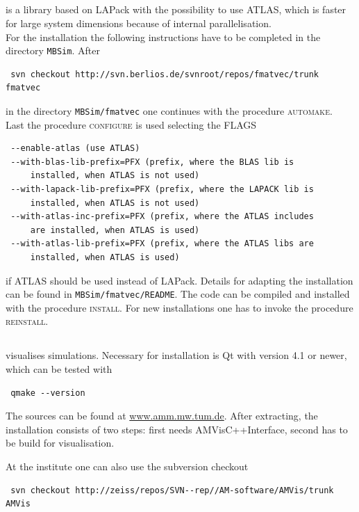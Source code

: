 \subsection{\FMatVec{}}
\FMatVec{} is a library based on LAPack with the possibility to use ATLAS, which is faster for large system dimensions because of internal parallelisation.\\
For the installation the following instructions have to be completed in the directory \texttt{MBSim}. After
\begin{verbatim}
 svn checkout http://svn.berlios.de/svnroot/repos/fmatvec/trunk fmatvec
\end{verbatim}
in the directory \texttt{MBSim/fmatvec} one continues with the procedure \textsc{automake}.\\
Last the procedure \textsc{configure} is used selecting the FLAGS
\begin{verbatim}
 --enable-atlas (use ATLAS)
 --with-blas-lib-prefix=PFX (prefix, where the BLAS lib is
     installed, when ATLAS is not used)
 --with-lapack-lib-prefix=PFX (prefix, where the LAPACK lib is
     installed, when ATLAS is not used)
 --with-atlas-inc-prefix=PFX (prefix, where the ATLAS includes 
     are installed, when ATLAS is used)
 --with-atlas-lib-prefix=PFX (prefix, where the ATLAS libs are
     installed, when ATLAS is used)
\end{verbatim}
if ATLAS should be used instead of LAPack. Details for adapting the installation can be found in \texttt{MBSim/fmatvec/README}. The code can be compiled and installed with the procedure \textsc{install}. For new installations one has to invoke the procedure \textsc{reinstall}.

\subsection{\AMVis{}}
\AMVis{} visualises \MBSim{} simulations. Necessary for installation is Qt with version 4.1 or newer, which can be tested with
\begin{verbatim}
 qmake --version
\end{verbatim}
The sources can be found at \url{www.amm.mw.tum.de}. After extracting, the installation consists of two steps: first \MBSim{} needs \textsf{AMVisC++Interface}, second \AMVis{} has to be build for visualisation. 

{\small At the institute one can also use the subversion checkout
\begin{verbatim}
 svn checkout http://zeiss/repos/SVN--rep//AM-software/AMVis/trunk AMVis
\end{verbatim}
}

